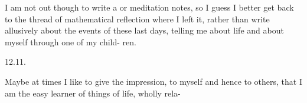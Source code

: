I am not out though to write a   or meditation notes, so I
guess I better get back to the thread of mathematical reflection where
I left it, rather than write allusively about the events of these last
days, telling me about life and\unsure{:} about myself through one of my child-%
ren.

12.11.

Maybe at times I like to give the impression, to myself and hence
to others, that I am the easy learner of things of life, wholly rela-%


